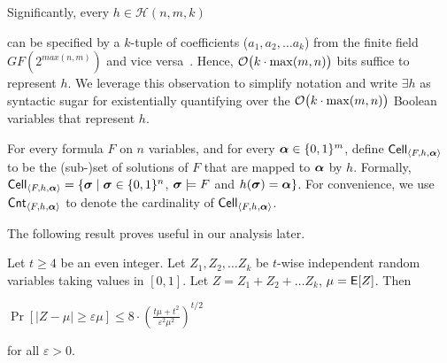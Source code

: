 Significantly, every $h \in \mathcal{H}(n,m,k)$


can be specified by a $k$-tuple of coefficients ($a_1, a_2, \ldots
a_k$) from the finite field $GF(2^{max(n,m)})$ and vice
versa~\cite{BGP2000}.  Hence, $\mathcal{O}\big(k\cdot\max(m,n)\big)$ bits
suffice to represent $h$.  We leverage this observation to simplify
notation and write $\exists h$ as syntactic sugar for existentially
quantifying over the $\mathcal{O}\big(k\cdot \max(m,n)\big)$ Boolean variables
that represent $h$.




For every formula $F$ on $n$ variables, and for every
${\boldsymbol{\alpha}} \in \{0,1\}^m$, define $\mathsf{Cell}_{\langle F, h,{\boldsymbol{\alpha}} \rangle}$ to be the
(sub-)set of solutions of $F$ that are mapped to ${\boldsymbol{\alpha}}$ by $h$.
Formally, $\mathsf{Cell}_{\langle F, h,{\boldsymbol{\alpha}} \rangle} = \{{\boldsymbol{\sigma}} \mid {\boldsymbol{\sigma}} \in \{0,1\}^n$,
${\boldsymbol{\sigma}}\models F$ and $h({\boldsymbol{\sigma}}) = {\boldsymbol{\alpha}}\}$.  For 
convenience, we use $\mathsf{Cnt}_{\langle F, h,{\boldsymbol{\alpha}} \rangle}$ to denote the cardinality of
$\mathsf{Cell}_{\langle F, h,{\boldsymbol{\alpha}} \rangle}$.

The following result proves useful in our analysis later.
\begin{proposition}{\cite{BR1994}}
	Let $t \geq 4$ be an even integer. Let $Z_1, Z_2, \ldots Z_k$
	be $t$-wise independent random variables taking values in
	$[0,1]$. Let $Z = Z_1 + Z_2 + \ldots Z_k$, $\mu
	= \mathsf{E}[Z]$. Then

$        \Pr[|Z-\mu| \geq \varepsilon \mu ] \leq
                    8 \cdot \left(\frac{t\mu +t^2}{\varepsilon^2 \mu^2}\right)^{t/2}
$

for all $\varepsilon > 0$.
\end{proposition}





